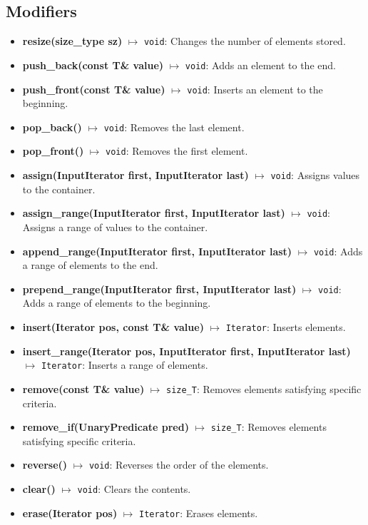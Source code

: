 \documentclass{report}
\begin{document}
    \subsection{Modifiers}
    \begin{itemize}
        \item \textbf{resize(size\_type sz)} $\mapsto$ \texttt{void}: Changes the number of elements stored.
        \item \textbf{push\_back(const T\& value)} $\mapsto$ \texttt{void}: Adds an element to the end.
        \item \textbf{push\_front(const T\& value)} $\mapsto$ \texttt{void}: Inserts an element to the beginning.
        \item \textbf{pop\_back()} $\mapsto$ \texttt{void}: Removes the last element.
        \item \textbf{pop\_front()} $\mapsto$ \texttt{void}: Removes the first element.
        \item \textbf{assign(InputIterator first, InputIterator last)} $\mapsto$ \texttt{void}: Assigns values to the container.
        \item \textbf{assign\_range(InputIterator first, InputIterator last)} $\mapsto$ \texttt{void}: Assigns a range of values to the container.
        \item \textbf{append\_range(InputIterator first, InputIterator last)} $\mapsto$ \texttt{void}: Adds a range of elements to the end.
        \item \textbf{prepend\_range(InputIterator first, InputIterator last)} $\mapsto$ \texttt{void}: Adds a range of elements to the beginning.
        \item \textbf{insert(Iterator pos, const T\& value)} $\mapsto$ \texttt{Iterator}: Inserts elements.
        \item \textbf{insert\_range(Iterator pos, InputIterator first, InputIterator last)} $\mapsto$ \texttt{Iterator}: Inserts a range of elements.
        \item \textbf{remove(const T\& value)} $\mapsto$ \texttt{size\_T}: Removes elements satisfying specific criteria.
        \item \textbf{remove\_if(UnaryPredicate pred)} $\mapsto$ \texttt{size\_T}: Removes elements satisfying specific criteria.
        \item \textbf{reverse()} $\mapsto$ \texttt{void}: Reverses the order of the elements.
        \item \textbf{clear()} $\mapsto$ \texttt{void}: Clears the contents.
        \item \textbf{erase(Iterator pos)} $\mapsto$ \texttt{Iterator}: Erases elements.

\end{itemize}
\end{document}
